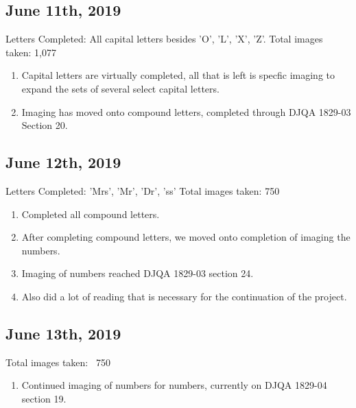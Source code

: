 \documentclass[12pt]{article} %
\begin{document}
\subsection{June 11th, 2019}
Letters Completed: All capital letters besides 'O', 'L', 'X', 'Z'.\newline
Total images taken: 1,077 \newline
\noindent\makebox[\linewidth]{\rule{15cm}{0.4pt}}
\begin{enumerate}[label = (\roman*)]
\item Capital letters are virtually completed, all that is left is specfic imaging to expand the sets of several select capital letters.
\item Imaging has moved onto compound letters, completed through DJQA 1829-03 Section 20.
\end{enumerate}

\subsection{June 12th, 2019}
Letters Completed: 'Mrs', 'Mr', 'Dr', 'ss' \newline
Total images taken: 750 \newline
\noindent\makebox[\linewidth]{\rule{15cm}{0.4pt}}
\begin{enumerate}[label = (\roman*)]
\item Completed all compound letters.
\item After completing compound letters, we moved onto completion of imaging the numbers.
\item Imaging of numbers reached DJQA 1829-03 section 24.
\item Also did a lot of reading that is necessary for the continuation of the project.
\end{enumerate}

\subsection{June 13th, 2019}
Total images taken: ~750 \newline
\noindent\makebox[\linewidth]{\rule{15cm}{0.4pt}}
\begin{enumerate}[label = (\roman*)]
\item Continued imaging of numbers for numbers, currently on DJQA 1829-04 section 19.
\end{enumerate}
\end{document}
